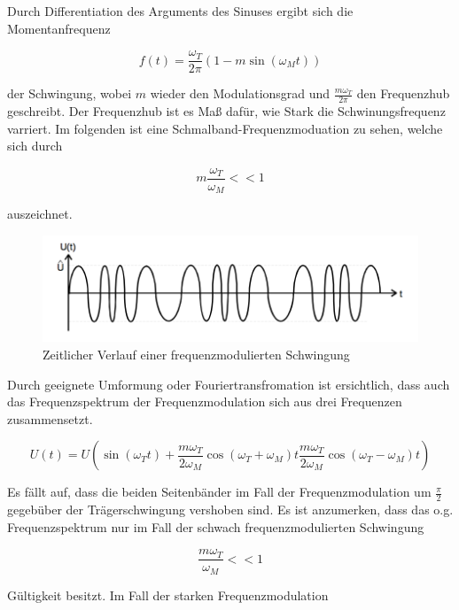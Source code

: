 Durch Differentiation des Arguments des Sinuses ergibt sich die Momentanfrequenz

\begin{equation}
f(t) = \frac{\omega_T}{2\pi}(1-m\sin(\omega_M t))
\label{eq:momFreq}
\end{equation}

der Schwingung, wobei $m$ wieder den Modulationsgrad und $\frac{m\omega_T}{2\pi}$ den Frequenzhub geschreibt. Der Frequenzhub ist es Maß dafür, wie Stark die Schwinungsfrequenz varriert. Im folgenden ist eine Schmalband-Frequenzmoduation zu sehen, welche sich durch

\begin{equation}
m\frac{\omega_T}{\omega_M} << 1
\end{equation}

auszeichnet.

\begin{figure}
	\centering
	\includegraphics[width=\textwidth]{img/Abb3.png}
	\caption{Zeitlicher Verlauf einer frequenzmodulierten Schwingung \cite{FP}}
\end{figure}

Durch geeignete Umformung oder Fouriertransfromation ist ersichtlich, dass auch das Frequenzspektrum der Frequenzmodulation sich aus drei Frequenzen zusammensetzt.

\begin{equation}
U(t) = U(\sin(\omega_T t) + \frac{m\omega_T}{2\omega_M}\cos(\omega_T + \omega_M) t \frac{m\omega_T}{2\omega_M}\cos(\omega_T - \omega_M) t)
\label{eq:FreqFreqMod}
\end{equation}

Es fällt auf, dass die beiden Seitenbänder im Fall der Frequenzmodulation um $\frac{\pi}{2}$ gegebüber der Trägerschwingung vershoben sind. Es ist anzumerken, dass das o.g. Frequenzspektrum nur im Fall der schwach frequenzmodulierten Schwingung

\begin{equation}
\frac{m\omega_T}{\omega_M} << 1
\end{equation}

Gültigkeit besitzt. Im Fall der starken Frequenzmodulation

